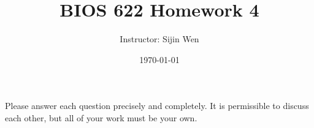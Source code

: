
\setlength{\oddsidemargin}{0.01in}
\setlength{\textwidth}{6.5in}
\setlength{\topmargin}{-0.51in}
\setlength{\textheight}{8.5in}


\def\bebf{\mbox{\boldmath $\beta$}}
\def\mubf{\mbox{\boldmath $\mu$}}
\def\epbf{\mbox{\scriptsize\boldmath $\epsilon$}}
\def\mus{\mbox{\scriptsize\boldmath $\mu$}}


\title{BIOS 622 Homework 4}
\vspace{0.2in}
\author{Instructor: Sijin Wen\\ }
\date{\today}
\maketitle

\baselineskip=18pt

Please answer each question precisely and completely. It is permissible to discuss each other, but all of your work must be your own.  

